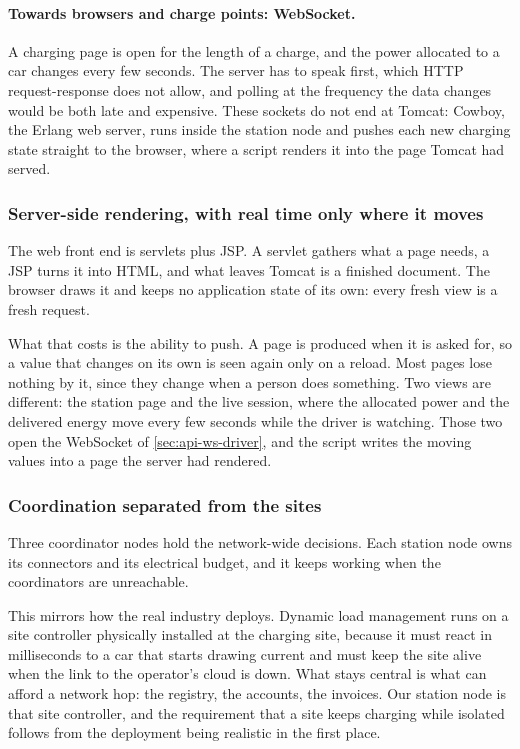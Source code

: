 \paragraph{Towards browsers and charge points: WebSocket.} A charging page is open for the
length of a charge, and the power allocated to a car changes every few seconds. The server
has to speak first, which HTTP request-response does not allow, and polling at the frequency
the data changes would be both late and expensive. These sockets do not end at Tomcat:
Cowboy, the Erlang web server, runs inside the station node and pushes each new charging
state straight to the browser, where a script renders it into the page Tomcat had served.

\subsubsection{Server-side rendering, with real time only where it moves}
\label{sec:ssr}

The web front end is servlets plus JSP. A servlet gathers what a page needs, a JSP turns it
into HTML, and what leaves Tomcat is a finished document. The browser draws it and keeps no
application state of its own: every fresh view is a fresh request.

What that costs is the ability to push. A page is produced when it is asked for, so a value
that changes on its own is seen again only on a reload. Most pages lose nothing by it, since
they change when a person does something. Two views are different: the station page and the
live session, where the allocated power and the delivered energy move every few seconds while
the driver is watching. Those two open the WebSocket of \cref{sec:api-ws-driver}, and the
script writes the moving values into a page the server had rendered.

\subsubsection{Coordination separated from the sites}
\label{sec:split}

Three coordinator nodes hold the network-wide decisions. Each station node owns its
connectors and its electrical budget, and it keeps working when the coordinators are
unreachable.

This mirrors how the real industry deploys. Dynamic load management runs on a site
controller physically installed at the charging site, because it must react in
milliseconds to a car that starts drawing current and must keep the site alive when the link
to the operator's cloud is down. What stays central is what can afford a network hop: the
registry, the accounts, the invoices. Our station node is that site controller, and the requirement that a site keeps
charging while isolated follows from the deployment being realistic in the first place.

